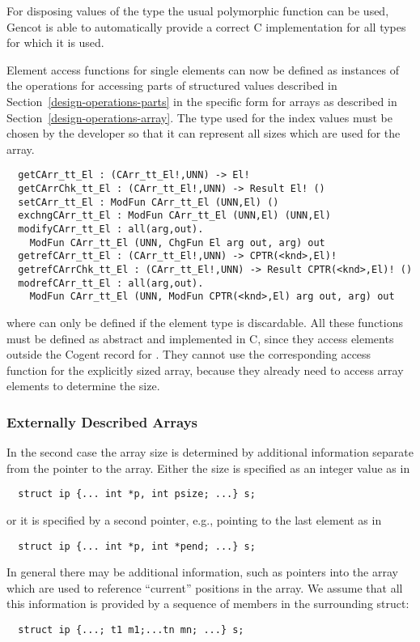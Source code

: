For disposing values of the type  the usual polymorphic function  can be used, 
Gencot is able to automatically provide a correct C implementation for all types for which it is used.

Element access functions for single elements can now be defined as instances of the operations for accessing parts 
of structured values described in Section~\ref{design-operations-parts} in the specific form for arrays as described
in Section~\ref{design-operations-array}. The type  used for the index
values must be chosen by the developer so that it can represent all sizes which are used for the array.
\begin{verbatim}
  getCArr_tt_El : (CArr_tt_El!,UNN) -> El!
  getCArrChk_tt_El : (CArr_tt_El!,UNN) -> Result El! ()
  setCArr_tt_El : ModFun CArr_tt_El (UNN,El) ()
  exchngCArr_tt_El : ModFun CArr_tt_El (UNN,El) (UNN,El)
  modifyCArr_tt_El : all(arg,out). 
    ModFun CArr_tt_El (UNN, ChgFun El arg out, arg) out
  getrefCArr_tt_El : (CArr_tt_El!,UNN) -> CPTR(<knd>,El)!
  getrefCArrChk_tt_El : (CArr_tt_El!,UNN) -> Result CPTR(<knd>,El)! ()
  modrefCArr_tt_El : all(arg,out). 
    ModFun CArr_tt_El (UNN, ModFun CPTR(<knd>,El) arg out, arg) out
\end{verbatim}
where  can only be defined if the element type  is discardable. All these functions
must be defined as abstract and implemented in C, since they access elements outside the Cogent record for .
They cannot use the corresponding access function for the explicitly sized array, because they already need to access
array elements to determine the size.

\subsubsection{Externally Described Arrays}

In the second case the array size is determined by additional information separate from the pointer to the array.
Either the size is specified as an integer value as in 
\begin{verbatim}
  struct ip {... int *p, int psize; ...} s;
\end{verbatim}
or it is specified by a second pointer, e.g., pointing to the last element as in
\begin{verbatim}
  struct ip {... int *p, int *pend; ...} s;
\end{verbatim}
In general there may be additional information, such as pointers into the array which are used to reference
``current'' positions in the array. We assume that all this information is provided by a sequence of members
in the surrounding struct:
\begin{verbatim}
  struct ip {...; t1 m1;...tn mn; ...} s;
\end{verbatim}

